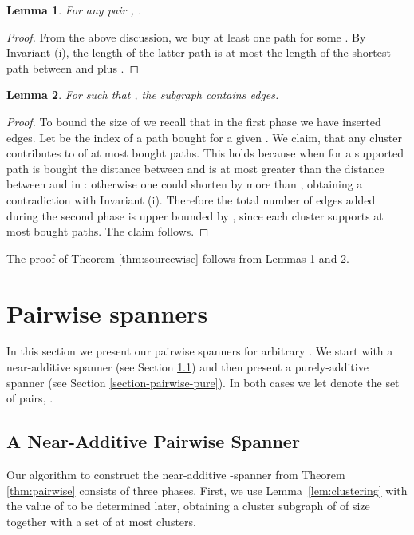 \documentclass[a4paper,11pt]{article}
\newtheorem{lemma}{Lemma}[section]
\theoremstyle{definition}
\begin{document}
\begin{lemma}\label{lem:stretchSourcewise}
For any pair ,  .
\end{lemma}
\begin{proof}
From the above discussion, we buy at least one path  for some . By Invariant (i), the length of the latter path is  at most the length of the shortest path  between  and  plus .
\end{proof}


\begin{lemma}
\label{lem:sizeSourcewise}
For  such that , the subgraph  contains \linebreak  edges. 
\end{lemma}
\begin{proof}
To bound the size of 
we recall that in the first phase we have inserted  edges.
Let  be the index of a path  bought for a given .
We claim, that any cluster  contributes to  of at most
 bought paths.
This holds because when for  a supported path is bought 
the distance between  and  is at most  greater than 
the distance between  and  in : otherwise one could shorten 
by more than , obtaining a contradiction with Invariant (i).
Therefore the total number of edges added during the second phase is upper bounded by
,
since each cluster  supports at most  bought paths. The claim follows.
\end{proof}
The proof of Theorem \ref{thm:sourcewise} follows from Lemmas \ref{lem:stretchSourcewise} and \ref{lem:sizeSourcewise}. 




\section{Pairwise spanners}
\label{section-pairwise}

In this section we present our pairwise spanners for arbitrary . We start with a near-additive spanner (see Section \ref{section-pairwise-near}) and then present a purely-additive spanner (see Section \ref{section-pairwise-pure}). In both cases we let  denote the set of pairs, .



\subsection{A Near-Additive Pairwise Spanner}
\label{section-pairwise-near}

Our algorithm to construct the near-additive -spanner from Theorem \ref{thm:pairwise} consists of three phases. First, 
we use Lemma~\ref{lem:clustering} with the value of 
to be determined later, obtaining a cluster subgraph  of 
of size  together with a set  of at most  clusters.
\end{document}
